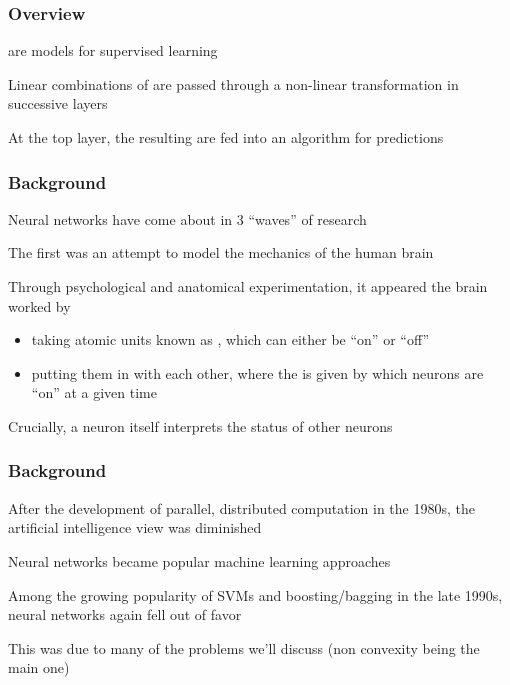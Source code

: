 \documentclass[12pt]{beamer}
\date{}
\begin{document}
\title{}
\subtitle{\classTitle}

\begin{frame}
\maketitle
%
\organization
%
\end{frame}


\begin{frame}[fragile]
\frametitle{Overview}
 are models for supervised learning

\vsp
Linear combinations of  are passed through a non-linear transformation in successive layers

\vsp
At the top layer, the resulting  are fed into an algorithm for predictions


\vsp
\vfill

\end{frame}


\begin{frame}[fragile]
\frametitle{Background}
Neural networks have come about in 3 ``waves'' of research

\vsp
The first was an attempt to model the mechanics of the human brain

\vsp
Through psychological and anatomical experimentation, it appeared the brain worked by
\begin{itemize}
\item taking atomic units known as , which can either be ``on'' or ``off''
\item putting them in  with each other, where the  is given by which neurons are ``on''
at a given time
\end{itemize}

\vsp
Crucially, a neuron itself interprets the status of other neurons
\end{frame}

\begin{frame}[fragile]
\frametitle{Background}
After the development of parallel, distributed computation in the 1980s, the artificial intelligence view was diminished

\vsp
Neural networks became popular machine learning approaches

\vsp
Among the growing popularity of SVMs and boosting/bagging in the late 1990s, neural networks again fell out of favor

\vsp
This was due to many of the problems we'll discuss (non convexity being the main one)
\end{frame}
\end{document}
